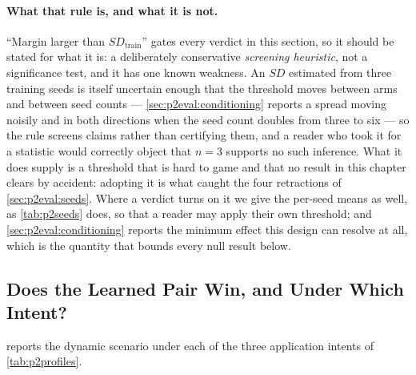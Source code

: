 \paragraph{What that rule is, and what it is not.} ``Margin larger than
$\mathit{SD}_{\mathrm{train}}$'' gates every verdict in this section, so it should be stated for what it
is: a deliberately conservative \emph{screening heuristic}, not a significance test, and it has one
known weakness. An $\mathit{SD}$ estimated from three
training seeds is itself uncertain enough that the threshold moves between arms and between seed
counts --- \cref{sec:p2eval:conditioning} reports a spread moving noisily and in both directions when
the seed count doubles from three to six --- so the rule screens claims rather than certifying them,
and a reader who took it for a statistic would correctly object that $n = 3$ supports no such
inference. What it does supply is a threshold that is hard to game and that no result in this chapter
clears by accident: adopting it is what caught the four retractions of \cref{sec:p2eval:seeds}. Where a
verdict turns on it we give the per-seed means as well, as \cref{tab:p2seeds} does, so that a reader may
apply their own threshold; and \cref{sec:p2eval:conditioning} reports the minimum effect this design
can resolve at all, which is the quantity that bounds every null result below.

\subsection{Does the Learned Pair Win, and Under Which Intent?}
\label{sec:p2eval:results}

 reports the dynamic scenario under each of the three application intents of
\cref{tab:p2profiles}.


